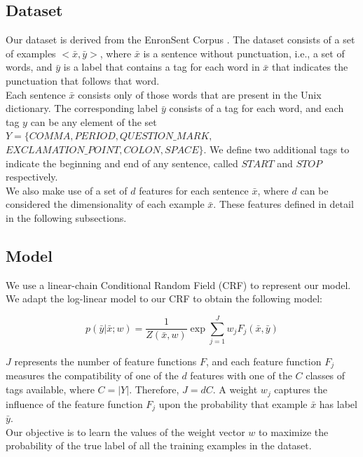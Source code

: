 \documentclass[11pt,a4paper,oneside]{article}
\begin{document}
\subsection{Dataset}

Our dataset is derived from the EnronSent Corpus \cite{enronsent}. The dataset consists of a set of examples $<\bar{x}, \bar{y}>$, where $\bar{x}$ is a sentence without punctuation, i.e., a set of words, and $\bar{y}$ is a label that contains a tag for each word in $\bar{x}$ that indicates the punctuation that follows that word.\\

Each sentence $\bar{x}$ consists only of those words that are present in the Unix dictionary. The corresponding label $\bar{y}$ consists of a tag for each word, and each tag $y$ can be any element of the set $Y = \{COMMA, PERIOD, QUESTION\_MARK,$ $EXCLAMATION\_POINT, COLON, SPACE\}$. We define two additional tags to indicate the beginning and end of any sentence, called $START$ and $STOP$ respectively.\\

We also make use of a set of $d$ features for each sentence $\bar{x}$, where $d$ can be considered the dimensionality of each example $\bar{x}$. These features defined in detail in the following subsections.

\subsection{Model}

We use a linear-chain Conditional Random Field (CRF) to represent our model. We adapt the log-linear model to our CRF to obtain the following model:

\begin{equation}
p(\bar{y}|\bar{x};w) = \frac{1}{Z(\bar{x}, w)}\exp\sum_{j=1}^{J}w_jF_j(\bar{x}, \bar{y})
\end{equation}

$J$ represents the number of feature functions $F$, and each feature function $F_j$ measures the compatibility of one of the $d$ features with one of the $C$ classes of tags available, where $C = |Y|$. Therefore, $J = dC$. A weight $w_j$ captures the influence of the feature function $F_j$ upon the probability that example $\bar{x}$ has label $\bar{y}$.\\

Our objective is to learn the values of the weight vector $w$ to maximize the probability of the true label of all the training examples in the dataset.\\
\end{document}

